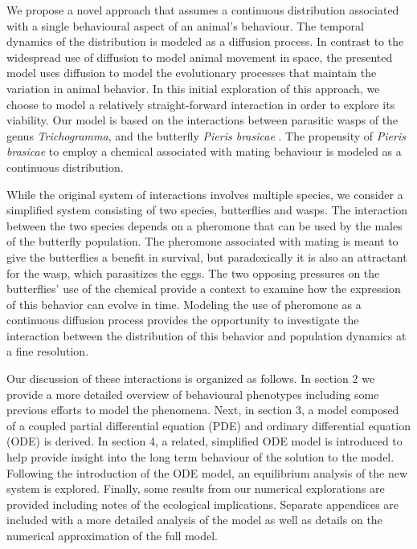 \documentclass[review,authoryear]{elsarticle}
\begin{document}
We propose a novel approach that assumes a continuous distribution
associated with a single behavioural aspect of an animal's behaviour. The temporal dynamics of the distribution is modeled as a diffusion process. In contrast to the widespread use of diffusion to model animal movement in space, the presented model uses diffusion to model the evolutionary processes that maintain the variation in animal behavior. In
this initial exploration of this approach, we choose to model a relatively
straight-forward interaction in order to explore its viability. Our model is based on
the interactions between parasitic wasps of the genus
\textit{Trichogramma}, and the butterfly \textit{Pieris
  brasicae} \citep{10.1093/beheco/arq007}.  The propensity of
\textit{Pieris brasicae} to employ a chemical associated with mating
behaviour is modeled as a continuous distribution.

While the original system of interactions involves multiple species, we consider a simplified system consisting of two species, butterflies and wasps. The interaction between the two species depends on a pheromone that can be used by the males of the butterfly population. The pheromone associated with mating is meant to give the butterflies a benefit in survival, but paradoxically it is also an attractant for the wasp, which parasitizes the eggs. The two opposing pressures on the butterflies' use of the chemical provide a context to examine how the expression of this behavior can evolve in time. Modeling the use of pheromone as a continuous diffusion process provides the opportunity to investigate the interaction between the distribution of this behavior and population dynamics at a fine resolution.

Our discussion of these interactions is organized as follows. In section 2 we  provide a more detailed overview of behavioural phenotypes
including some previous efforts to model the phenomena. Next, in section 3, a model composed of a coupled partial differential equation (PDE) and ordinary differential equation (ODE) is derived. 
In section 4, a related, simplified ODE model is introduced to help provide insight into the
long term behaviour of the solution to the model. Following the introduction of the ODE model, an equilibrium analysis of the new system is explored. Finally, some results from our numerical explorations are provided including notes of the ecological implications. Separate appendices are included with a more detailed analysis of the model as well as details on the numerical approximation of the full model.
\end{document}

